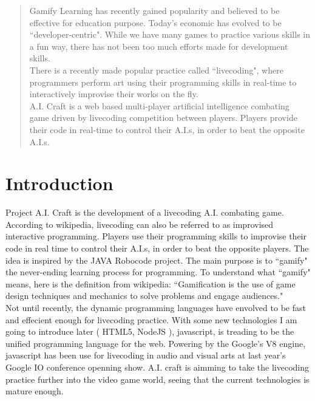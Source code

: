 \documentclass[12pt]{article}
\begin{document}
\maketitle

\begin{abstract}
Gamify Learning has recently gained popularity and believed to be effective for education purpose. Today’s economic has evolved to be ``developer-centric"\cite{venkatesh2011}. While we have many games to practice various skills in a fun way, there has not been too much efforts made for development skills.\\ 

There is a recently made popular practice called ``livecoding", where programmers perform art using their programming skills in real-time to interactively improvise their works on the fly.\\ 

A.I. Craft is a web based multi-player artificial intelligence combating game driven by livecoding competition between players. Players provide their code in real-time to control their A.I.s, in order to beat the opposite A.I.s. 
\end{abstract}

\section{Introduction}
Project A.I. Craft is the development of a livecoding A.I. combating game. According to wikipedia, livecoding can also be referred to as improvised interactive programming. Players use their programming skills to improvise their code in real time to control their A.I.s, in order to beat the opposite players. The idea is inspired by the JAVA Robocode\cite{robocode01} project. The main purpose is to ``gamify" the never-ending learning process for programming. To understand what ``gamify" means, here is the definition from wikipedia: ``Gamification is the use of game design techniques and mechanics to solve problems and engage audiences."\\

Not until recently, the dynamic programming languages have envolved to be fast and effecient enough for livecoding practice. With some new technologies I am going to introduce later ( HTML5, NodeJS ), javascript, is treading to be the unified programming language for the web. Powering by the Google's V8 engine, javascript has been use for livecoding in audio and visual arts at last year's Google IO conference openning show. A.I. craft is aimming to take the livecoding practice further into the video game world, seeing that the current technologies is mature enough.\\
\end{document}
